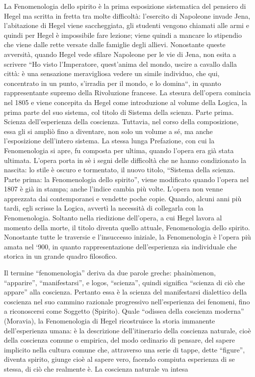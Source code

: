 \documentclass[a4paper,12pt,oneside,openany]{book}%
\begin{document}
La Fenomenologia dello spirito è la prima esposizione sistematica del pensiero di Hegel ma scritta in fretta tra molte difficoltà: l’esercito di Napoleone invade Jena, l’abitazione di Hegel viene saccheggiata,  gli studenti vengono chiamati alle armi e quindi per Hegel è impossibile fare lezione; viene quindi a mancare lo stipendio che viene dalle rette versate dalle famiglie degli allievi. Nonostante queste avversità, quando Hegel vede sfilare Napoleone per le vie di Jena, non esita a scrivere “Ho visto l’Imperatore, quest’anima del mondo, uscire a cavallo dalla città: è una sensazione meravigliosa vedere un simile individuo, che qui, concentrato in un punto, s’irradia per il mondo, e lo domina“, in quanto rappresentante supremo della Rivoluzione francese. La stesura dell’opera comincia nel 1805 e viene concepita da Hegel come introduzione al volume della Logica, la prima parte del suo sistema, col titolo di Sistema della scienza. Parte prima. Scienza dell’esperienza della coscienza. Tuttavia, nel corso della composizione, essa gli si ampliò fino a diventare, non solo un volume a sé, ma anche l’esposizione dell’intero sistema. La stessa lunga Prefazione, con cui la Fenomenologia si apre, fu composta per ultima, quando l’opera era già stata ultimata. L’opera porta in sè i segni delle difficoltà  che ne hanno condizionato  la nascita: lo stile è oscuro e tormentato, il nuovo titolo, “Sistema della scienza. Parte prima: la Fenomenologia dello spirito”, viene modificato quando l’opera nel 1807 è già in stampa; anche l’indice cambia più volte. L’opera non venne apprezzata dai contemporanei e vendette poche copie. Quando, alcuni anni più tardi, egli scrisse la Logica, avvertì la necessità di collegarla con la Fenomenologia. Soltanto nella riedizione dell’opera, a cui Hegel lavora al momento della morte, il titolo diventa quello attuale, Fenomenologia dello spirito. Nonostante tutte le traversie e l’insuccesso iniziale, la Fenomenologia è l’opera più amata nel ‘900, in quanto rappresentazione dell’esperienza sia individuale che storica in un grande quadro filosofico.

Il termine “fenomenologia” deriva da due parole greche: phainòmenon, “apparire”, “manifestarsi”, e logos, “scienza”, quindi significa “scienza di ciò che appare” alla coscienza. Pertanto essa è la scienza del manifestarsi dialettico della coscienza nel suo cammino razionale progressivo nell’esperienza dei fenomeni, fino a riconoscersi come Soggetto (Spirito). Quale “odissea della coscienza moderna” (Moravia), la Fenomenologia di Hegel ricostruisce la storia immanente dell’esperienza umana: è la descrizione dell’itinerario della coscienza naturale, cioè della coscienza comune o empirica, del modo ordinario di pensare, del sapere implicito nella cultura comune che, attraverso una serie di tappe, dette “figure”, diventa spirito, giunge cioè al sapere vero, facendo compiuta esperienza di se stessa, di ciò che realmente è. La coscienza naturale va intesa
\end{document}
